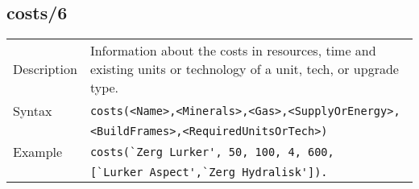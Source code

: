 \subsection{costs/6}
\begin{tabularx}{\textwidth}{lX}
 Description & Information about the costs in resources, time and existing units or technology of a unit, tech, or upgrade type. \\
 Syntax & \verb|costs(<Name>,<Minerals>,<Gas>,<SupplyOrEnergy>,| \\ & \quad \verb|<BuildFrames>,<RequiredUnitsOrTech>)| \\
 Example & \verb|costs(`Zerg Lurker', 50, 100, 4, 600,| \\ & \quad \verb|[`Lurker Aspect',`Zerg Hydralisk']).| \\
 \end{tabularx}
